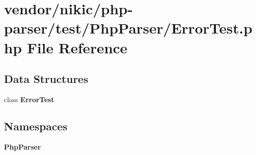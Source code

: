 \section{vendor/nikic/php-\/parser/test/\+Php\+Parser/\+Error\+Test.php File Reference}
\label{_error_test_8php}
\subsection*{Data Structures}
\begin{DoxyCompactItemize}
\item 
class {\bf Error\+Test}
\end{DoxyCompactItemize}
\subsection*{Namespaces}
\begin{DoxyCompactItemize}
\item 
 {\bf Php\+Parser}
\end{DoxyCompactItemize}
